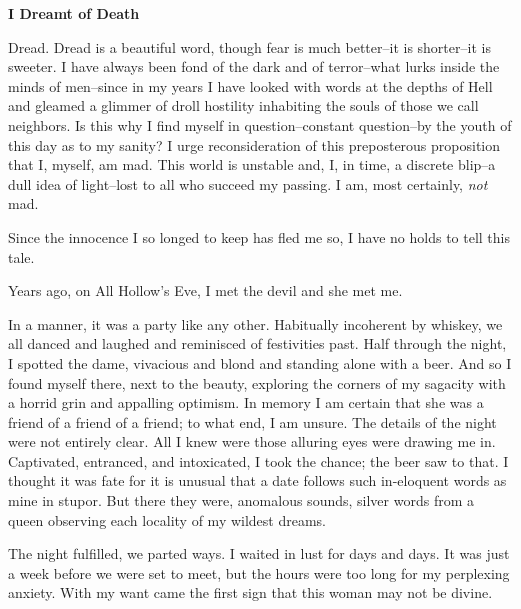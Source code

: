 \documentclass{article}
\begin{document}


\begin{center}
\large\textbf{I Dreamt of Death}
\end{center}


\noindent
Dread.
Dread is a beautiful word,
though fear is much better--it is shorter--it is sweeter.
I have always been fond of the dark and of terror--what
lurks inside the minds of men--since in my years
I have looked with words at the depths of Hell
and gleamed a glimmer of droll hostility
inhabiting the souls of those we call neighbors.
Is this why I find myself in question--constant question--by
the youth of this day as to my sanity?
I urge reconsideration of this preposterous proposition that
I, myself, am mad.
This world is unstable and, I, in time, a discrete blip--a
dull idea of light--lost to all who succeed my passing.
I am, most certainly, \textit{not} mad.
\VV


\noindent %
Since the innocence I so longed to keep has fled me so,
I have no holds to tell this tale. %
\VV


\noindent
Years ago, on All Hollow's Eve,
I met the devil and she met me.
\VV


\noindent
In a manner, it was a party like any other.
Habitually incoherent by whiskey,
we all danced and laughed and reminisced of festivities past.
Half through the night, I spotted the dame,
vivacious and blond and standing alone with a beer.
And so I found myself there, next to the beauty,
exploring the corners of my sagacity with a horrid
grin and appalling optimism.
In memory I am certain that she was a friend of
a friend of a friend; to what end, I am unsure.
The details of the night were not entirely clear.
All I knew were those alluring eyes were drawing me in.
Captivated, entranced, and intoxicated,
I took the chance; the beer saw to that.
I thought it was fate for it is unusual
that a date follows such in-eloquent words
as mine in stupor.
But there they were, anomalous sounds,
silver words from a queen observing each
locality of my wildest dreams.


The night fulfilled, we parted ways.
I waited in lust for days and days.
It was just a week before we were set to meet, %
but the hours were too long for my perplexing anxiety.
With my want came the first sign that this woman may not be divine.
\end{document}
